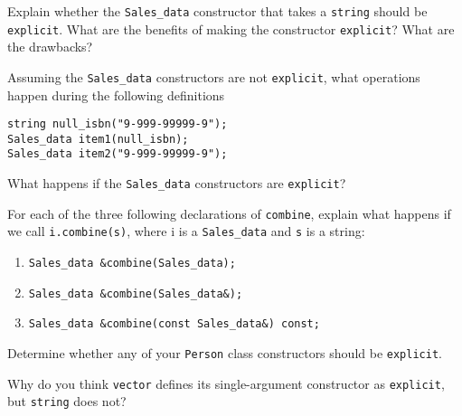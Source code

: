 %
%
\begin{question}
Explain whether the \verb|Sales_data| constructor that takes a
\verb|string| should be \verb|explicit|. What are the benefits of making the
constructor \verb|explicit|? What are the drawbacks?
\end{question}

\begin{question}
Assuming the \verb|Sales_data| constructors are not \verb|explicit|,
what operations happen during the following definitions
\begin{lstlisting}
string null_isbn("9-999-99999-9");
Sales_data item1(null_isbn);
Sales_data item2("9-999-99999-9");
\end{lstlisting}
\end{question}
What happens if the \verb|Sales_data| constructors are \verb|explicit|?

\begin{question}
For each of the three following declarations of \verb|combine|,
explain what happens if we call \verb|i.combine(s)|, where i is a \verb|Sales_data|
and \verb|s| is a string:
\begin{enumerate}[label=(\alph*)]
^^I\item \verb|Sales_data &combine(Sales_data);|
^^I\item \verb|Sales_data &combine(Sales_data&);|
^^I\item \verb|Sales_data &combine(const Sales_data&) const;|
\end{enumerate}
\end{question}

\begin{question}
Determine whether any of your \verb|Person| class constructors
should be \verb|explicit|.
\end{question}

\begin{question}
Why do you think \verb|vector| defines its single-argument
constructor as \verb|explicit|, but \verb|string| does not?
\end{question}
